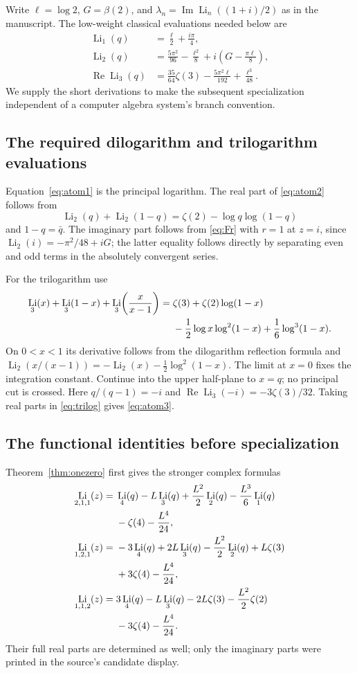 \documentclass[11pt]{article}
\numberwithin{equation}{section}
\theoremstyle{definition}\newtheorem{definition}[theorem]{Definition}
\theoremstyle{remark}\newtheorem{remark}[theorem]{Remark}
\DeclareMathOperator{\Li}{Li}
\DeclareMathOperator{\Rea}{Re}
\DeclareMathOperator{\Ima}{Im}
\begin{document}
Write $\ell=\log2$, $G=\beta(2)$, and
$\lambda_n=\Ima\Li_n((1+i)/2)$ as in the manuscript.
The low-weight classical evaluations needed below are
\begin{align}
\Li_1(q)&=\frac\ell2+\frac{i\pi}{4},\label{eq:atom1}\\
\Li_2(q)&=\frac{5\pi^2}{96}-\frac{\ell^2}{8}
 +i\left(G-\frac{\pi\ell}{8}\right),\label{eq:atom2}\\
\Rea\Li_3(q)&=\frac{35}{64}\zeta(3)
 -\frac{5\pi^2\ell}{192}+\frac{\ell^3}{48}.\label{eq:atom3}
\end{align}
We supply the short derivations to make the subsequent specialization
independent of a computer algebra system's branch convention.

\subsection{The required dilogarithm and trilogarithm evaluations}
Equation~\eqref{eq:atom1} is the principal logarithm.
The real part of \eqref{eq:atom2} follows from
\[
 \Li_2(q)+\Li_2(1-q)=\zeta(2)-\log q\log(1-q)
\]
and $1-q=\bar q$. The imaginary part follows from
\eqref{eq:Fr} with $r=1$ at $z=i$, since
$\Li_2(i)=-\pi^2/48+iG$; the latter equality follows directly by
separating even and odd terms in the absolutely convergent series.

For the trilogarithm use
\begin{align}
\Li_3(x)+\Li_3(1-x)+\Li_3\!\left(\frac{x}{x-1}\right)
={}&\zeta(3)+\zeta(2)\log(1-x)\notag\\
&-\frac12\log x\log^2(1-x)
 +\frac16\log^3(1-x).\label{eq:trilog}
\end{align}
On $0<x<1$ its derivative follows from the dilogarithm reflection
formula and
$\Li_2(x/(x-1))=-\Li_2(x)-\tfrac12\log^2(1-x)$.
The limit at $x=0$ fixes the integration constant. Continue into the
upper half-plane to $x=q$; no principal cut is crossed.
Here $q/(q-1)=-i$ and $\Rea\Li_3(-i)=-3\zeta(3)/32$.
Taking real parts in \eqref{eq:trilog} gives \eqref{eq:atom3}.

\subsection{The functional identities before specialization}
Theorem~\ref{thm:onezero} first gives the stronger complex formulas
\begin{align}
\Li_{2,1,1}(z)
={}&\Li_4(q)-L\Li_3(q)+\frac{L^2}{2}\Li_2(q)
-\frac{L^3}{6}\Li_1(q)\notag\\
&-\zeta(4)-\frac{L^4}{24},\label{eq:t211}\\
\Li_{1,2,1}(z)
={}&-3\Li_4(q)+2L\Li_3(q)-\frac{L^2}{2}\Li_2(q)
+L\zeta(3)\notag\\
&+3\zeta(4)-\frac{L^4}{24},\label{eq:t121}\\
\Li_{1,1,2}(z)
={}&3\Li_4(q)-L\Li_3(q)-2L\zeta(3)
-\frac{L^2}{2}\zeta(2)\notag\\
&-3\zeta(4)-\frac{L^4}{24}.\label{eq:t112}
\end{align}
Their full real parts are determined as well; only the imaginary parts
were printed in the source's candidate display.
\end{document}
